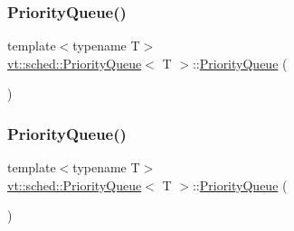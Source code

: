 \subsubsection{\texorpdfstring{Priority\+Queue()}{PriorityQueue()}\hspace{0.1cm}{\footnotesize\ttfamily [1/3]}}
{\footnotesize\ttfamily template$<$typename T$>$ \\
\hyperlink{structvt_1_1sched_1_1_priority_queue}{vt\+::sched\+::\+Priority\+Queue}$<$ T $>$\+::\hyperlink{structvt_1_1sched_1_1_priority_queue}{Priority\+Queue} (\begin{DoxyParamCaption}{ }\end{DoxyParamCaption})\hspace{0.3cm}{\ttfamily [default]}}

\mbox{\label{structvt_1_1sched_1_1_priority_queue_aca0fe178fbd601fa22816c2d895d5435}} 
\subsubsection{\texorpdfstring{Priority\+Queue()}{PriorityQueue()}\hspace{0.1cm}{\footnotesize\ttfamily [2/3]}}
{\footnotesize\ttfamily template$<$typename T$>$ \\
\hyperlink{structvt_1_1sched_1_1_priority_queue}{vt\+::sched\+::\+Priority\+Queue}$<$ T $>$\+::\hyperlink{structvt_1_1sched_1_1_priority_queue}{Priority\+Queue} (\begin{DoxyParamCaption}\item[{\hyperlink{structvt_1_1sched_1_1_priority_queue}{Priority\+Queue}$<$ T $>$ const \&}]{ }\end{DoxyParamCaption})\hspace{0.3cm}{\ttfamily [default]}}

\mbox{\label{structvt_1_1sched_1_1_priority_queue_a25eedffc3b4665d0c1bb27027803e571}} 
